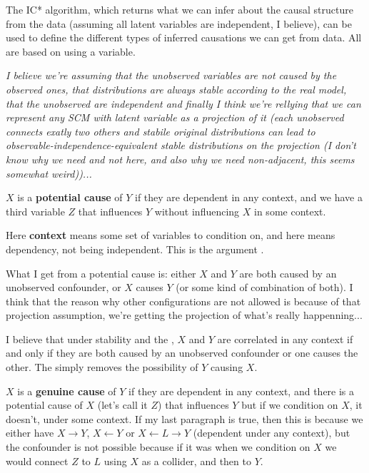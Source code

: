 The IC* algorithm, which returns what we can infer about the causal structure from the data (assuming all latent variables are independent, I believe), can be used to define the different types of inferred causations we can get from data. All are based on using a  variable.

\textit{I believe we're assuming that the unobserved variables are not caused by the observed ones, that distributions are always stable according to the real model, that the unobserved are independent and finally I think we're rellying that we can represent any SCM with latent variable as a projection of it (each unobserved connects exatly two others and stabile original distributions can lead to observable-independence-equivalent stable distributions on the projection (I don't know why we need  and not  here, and also why we need non-adjacent, this seems somewhat weird))...}

$X$ is a \textbf{potential cause} of $Y$ if they are dependent in any context, and we have a third variable $Z$ that influences $Y$ without influencing $X$ in some context. 

Here \textbf{context} means some set of variables to condition on, and  here means dependency, not being independent. This is the argument .

What I get from a potential cause is: either $X$ and $Y$ are both caused by an unobserved confounder, or $X$ causes $Y$ (or some kind of combination of both). I think that the reason why other configurations are not allowed is because of that projection assumption, we're getting the projection of what's really happenning...

I believe that under stability and the , $X$ and $Y$ are correlated in any context if and only if they are both caused by an unobserved confounder or one causes the other. The  simply removes the possibility of $Y$ causing $X$.

$X$ is a \textbf{genuine cause} of $Y$ if they are dependent in any context, and there is a potential cause of $X$ (let's call it $Z$) that influences $Y$ but if we condition on $X$, it doesn't, under some context. If my last paragraph is true, then this is because we either have $X\rightarrow Y$, $X \leftarrow Y$ or $X \leftarrow L \rightarrow Y$ (dependent under any context), but the confounder is not possible because if it was when we condition on $X$ we would connect $Z$ to $L$ using $X$ as a collider, and then to $Y$.

